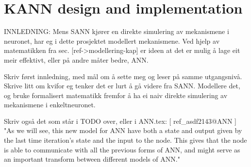 
%



\section{KANN design and implementation}
\label{secKANN}
	
	INNLEDNING: Mens SANN kjører en direkte simulering av mekanismene i neuronet, har eg i dette prosjektet modellert mekanismene.
	Ved hjelp av matematikken fra sec. [ref->modellering-kap] er ideen at det er mulig å lage eit meir effektivt, eller på andre måter bedre, ANN.

	Skriv først innledning, med mål om å sette meg og leser på samme utgangsnivå.
	Skrive litt om kvifor eg tenker det er lurt å gå videre fra SANN.
	Modellere det, og bruke formalisert matematikk fremfor å ha ei naiv direkte simulering av mekanismene i enkeltneuronet.

	Skriv også det som står i TODO over, eller i ANN.tex: [ ref\_asdf2143@ANN ]%
	"As we will see, this new model for ANN have both a state and output given by the last time iteration's state and the input to the node. 
	This gives that the node is able to communicate with all the previous forms of ANN, and might serve as an important transform between different models of ANN."

